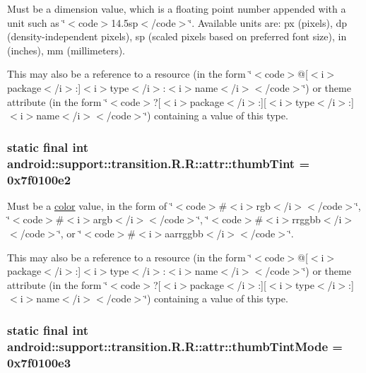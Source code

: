 Must be a dimension value, which is a floating point number appended with a unit such as \char`\"{}$<$code$>$14.5sp$<$/code$>$\char`\"{}. Available units are: px (pixels), dp (density-independent pixels), sp (scaled pixels based on preferred font size), in (inches), mm (millimeters). 

This may also be a reference to a resource (in the form \char`\"{}$<$code$>$@\mbox{[}$<$i$>$package$<$/i$>$:\mbox{]}$<$i$>$type$<$/i$>$:$<$i$>$name$<$/i$>$$<$/code$>$\char`\"{}) or theme attribute (in the form \char`\"{}$<$code$>$?\mbox{[}$<$i$>$package$<$/i$>$:\mbox{]}\mbox{[}$<$i$>$type$<$/i$>$:\mbox{]}$<$i$>$name$<$/i$>$$<$/code$>$\char`\"{}) containing a value of this type. \hypertarget{classandroid_1_1support_1_1transition_1_1_r_1_1attr_b538edde1740919db829b7cecc64da20}{
\subsubsection[{thumbTint}]{\setlength{\rightskip}{0pt plus 5cm}static final int android::support::transition.R.R::attr::thumbTint = 0x7f0100e2}}
\label{classandroid_1_1support_1_1transition_1_1_r_1_1attr_b538edde1740919db829b7cecc64da20}


Must be a \hyperlink{classandroid_1_1support_1_1transition_1_1_r_1_1color}{color} value, in the form of \char`\"{}$<$code$>$\#$<$i$>$rgb$<$/i$>$$<$/code$>$\char`\"{}, \char`\"{}$<$code$>$\#$<$i$>$argb$<$/i$>$$<$/code$>$\char`\"{}, \char`\"{}$<$code$>$\#$<$i$>$rrggbb$<$/i$>$$<$/code$>$\char`\"{}, or \char`\"{}$<$code$>$\#$<$i$>$aarrggbb$<$/i$>$$<$/code$>$\char`\"{}. 

This may also be a reference to a resource (in the form \char`\"{}$<$code$>$@\mbox{[}$<$i$>$package$<$/i$>$:\mbox{]}$<$i$>$type$<$/i$>$:$<$i$>$name$<$/i$>$$<$/code$>$\char`\"{}) or theme attribute (in the form \char`\"{}$<$code$>$?\mbox{[}$<$i$>$package$<$/i$>$:\mbox{]}\mbox{[}$<$i$>$type$<$/i$>$:\mbox{]}$<$i$>$name$<$/i$>$$<$/code$>$\char`\"{}) containing a value of this type. \hypertarget{classandroid_1_1support_1_1transition_1_1_r_1_1attr_4b21746ca8a1e61c132d579e4aec731b}{
\subsubsection[{thumbTintMode}]{\setlength{\rightskip}{0pt plus 5cm}static final int android::support::transition.R.R::attr::thumbTintMode = 0x7f0100e3}}
\label{classandroid_1_1support_1_1transition_1_1_r_1_1attr_4b21746ca8a1e61c132d579e4aec731b}


